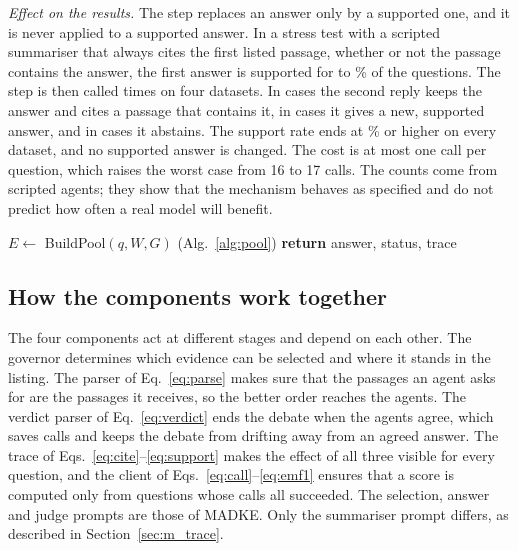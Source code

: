 \emph{Effect on the results.} The step replaces an answer only by a supported one, and it is never applied to a supported answer. In a stress test with a scripted summariser that always cites the first listed passage, whether or not the passage contains the answer, the first answer is supported for \VStressBeforeMin{} to \VStressBeforeMax\% of the questions. The step is then called \VStressCalls{} times on four datasets. In \VStressSame{} cases the second reply keeps the answer and cites a passage that contains it, in \VStressNew{} cases it gives a new, supported answer, and in \VStressAbst{} cases it abstains. The support rate ends at \VStressAfterMin\% or higher on every dataset, and no supported answer is changed. The cost is at most one call per question, which raises the worst case from 16 to 17 calls. The counts come from scripted agents; they show that the mechanism behaves as specified and do not predict how often a real model will benefit.

\begin{algorithm}[!htbp]
\caption{MADKE-X control flow}
\label{alg:control}
$E \leftarrow$ BuildPool$(q, W, G)$ (Alg.~\ref{alg:pool})\;
\textbf{return} answer, status, trace\;
\end{algorithm}

\subsection{How the components work together}
The four components act at different stages and depend on each other. The governor determines which evidence can be selected and where it stands in the listing. The parser of Eq.~\eqref{eq:parse} makes sure that the passages an agent asks for are the passages it receives, so the better order reaches the agents. The verdict parser of Eq.~\eqref{eq:verdict} ends the debate when the agents agree, which saves calls and keeps the debate from drifting away from an agreed answer. The trace of Eqs.~\eqref{eq:cite}--\eqref{eq:support} makes the effect of all three visible for every question, and the client of Eqs.~\eqref{eq:call}--\eqref{eq:emf1} ensures that a score is computed only from questions whose calls all succeeded. The selection, answer and judge prompts are those of MADKE. Only the summariser prompt differs, as described in Section~\ref{sec:m_trace}.
